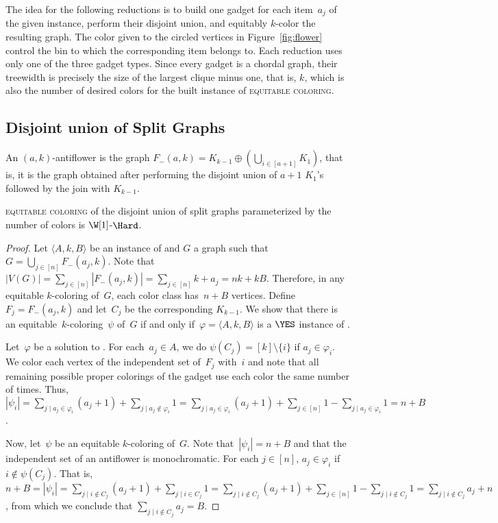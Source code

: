 The idea for the following reductions is to build one gadget for each item~$a_j$ of the given  instance, perform their disjoint union, and equitably $k$-color the resulting graph.
The color given to the circled vertices in Figure~\ref{fig:flower} control the bin to which the corresponding item belongs to.
Each reduction uses only one of the three gadget types.
Since every gadget is a chordal graph, their treewidth is precisely the size of the largest clique minus one, that is, $k$, which is also the number of desired colors for the built instance of \textsc{equitable coloring}.

\subsection{Disjoint union of Split Graphs}

\begin{definition}
    An $(a,k)$-antiflower is the graph $F_-(a,k) = K_{k-1} \oplus \left(\bigcup_{i \in [a+1]} K_1\right)$, that is, it is the graph obtained after performing the disjoint union of $a+1$ $K_1$'s followed by the join with $K_{k-1}$.
\end{definition}

\begin{theorem}
    \label{thm:dis_split}
    \textsc{equitable coloring} of the disjoint union of split graphs parameterized by the number of colors is $\W[1]$-$\Hard$.
\end{theorem}
\begin{proof}
    Let $\langle A,k,B\rangle$ be an instance of  and $G$ a graph such that~$G = \bigcup_{j \in [n]} F_-(a_j,k)$.
    Note that $|V(G)| = \sum_{j \in [n]} |F_-(a_j, k)| = \sum_{j \in [n]} k + a_j = nk + kB$.
    Therefore, in any equitable $k$-coloring of~$G$, each color class has~$n + B$ vertices.
    Define~$F_j = F_-(a_j,k)$ and let~$C_j$ be the corresponding $K_{k-1}$.
    We show that there is an equitable~$k$-coloring~$\psi$ of~$G$ if and only if~$\varphi = \langle A,k,B\rangle$ is a $\YES$ instance of .
    
    Let~$\varphi$ be a solution to .
    For each~$a_j \in A$, we do $\psi(C_j) = [k] \setminus \{i\}$ if $a_j \in \varphi_i$.
    We color each vertex of the independent set of~$F_{j}$ with~$i$ and note that all remaining possible proper colorings of the gadget use each color the same number of times.
    Thus, $|\psi_i| = \sum_{j \mid a_j \in \varphi_i} (a_j + 1) + \sum_{j \mid a_j \notin \varphi_i} 1 = \sum_{j \mid a_j \in \varphi_i} (a_j + 1) + \sum_{j \in [n]} 1 - \sum_{j \mid a_j \in \varphi_i} 1 = n + B$.
    
    Now, let~$\psi$ be an equitable $k$-coloring of~$G$.
    Note that~$|\psi_i| = n+B$ and that the independent set of an antiflower is monochromatic.
    For each $j \in [n]$, $a_j \in \varphi_i$ if $i \notin \psi(C_j)$.
    That is, $n + B = |\psi_i| = \sum_{j \mid i \notin C_j} (a_j + 1) + \sum_{j \mid i \in C_j} 1 = \sum_{j \mid i \notin C_j} (a_j + 1) + \sum_{j \in [n]} 1 - \sum_{j \mid i \notin C_j} 1 = \sum_{j \mid i \notin C_j} a_j + n$, from which we conclude that $\sum_{j \mid i \notin C_j} a_j = B$.
\end{proof}

